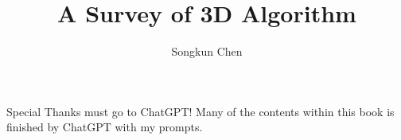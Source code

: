 \documentclass[11pt,openany]{book}
\title{A Survey of 3D Algorithm}
\author{Songkun Chen}
\begin{document}
\frontmatter
\maketitle
\chapter*{}
Special Thanks must go to ChatGPT! Many of the contents within this book is finished by ChatGPT with my prompts.

\tableofcontents









\end{document}
